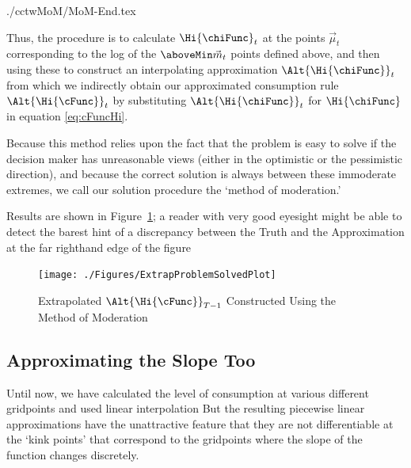 \documentclass[titlepage, headings=optiontotocandhead]{\econtex}
\begin{document}
\begin{verbatimwrite}{./cctwMoM/MoM-End.tex}

  Thus, the procedure is to calculate $\Hi{\chiFunc}_{t}$ at the points
  $\vec{\mu}_{t}$ corresponding to the log of the $\aboveMin
  \vec{m}_{t}$ points defined above, and then using these to construct an
  interpolating approximation $\Alt{\Hi{\chiFunc}}_{t}$ from which we indirectly obtain our 
  approximated consumption rule $\Alt{\Hi{\cFunc}}_{t}$ by substituting $\Alt{\Hi{\chiFunc}}_{t}$ for $\Hi{\chiFunc}$ in equation \eqref{eq:cFuncHi}.

  Because this method relies upon the fact that the problem is easy to
  solve if the decision maker has unreasonable views (either in the
  optimistic or the pessimistic direction), and because the correct
  solution is always between these immoderate extremes, we call our 
  solution procedure the `method of moderation.'

  Results are shown in Figure~\ref{fig:ExtrapProblemSolved}; a reader
  with very good eyesight might be able to detect the barest hint of a
  discrepancy between the Truth and the Approximation at the far
  righthand edge of the figure
  \hypertarget{ExtrapProblemSolvedPlot}{}
  \begin{figure}
    \texttt{[image: ./Figures/ExtrapProblemSolvedPlot]}
    \caption{Extrapolated $\Alt{\Hi{\cFunc}}_{T-1}$ Constructed Using the Method of Moderation}
    \label{fig:ExtrapProblemSolved}
  \end{figure}
\end{verbatimwrite}
\unskip

\hypertarget{Approximating-the-Slope-Too}{}
\subsection{Approximating the Slope Too}


Until now, we have calculated the level of consumption at
various different gridpoints and used linear interpolation  But the
resulting piecewise linear approximations have the unattractive feature
that they are not differentiable at the `kink points' that correspond to
the gridpoints where the slope of the function changes discretely.
\end{document}
